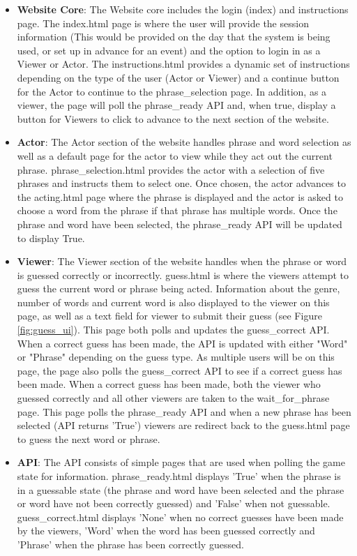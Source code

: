\begin{itemize}

	\item \textbf{Website Core}: The Website core includes the login (index) and instructions page. The index.html page is where the user will provide the session information (This would be provided on the day that the system is being used, or set up in advance for an event) and the option to login in as a Viewer or Actor. The instructions.html provides a dynamic set of instructions depending on the type of the user (Actor or Viewer) and a continue button for the Actor to continue to the phrase\_selection page. In addition, as a viewer, the page will poll the phrase\_ready API and, when true, display a button for Viewers to click to advance to the next section of the website.
	
	\item \textbf{Actor}: The Actor section of the website handles phrase and word selection as well as a default page for the actor to view while they act out the current phrase. phrase\_selection.html provides the actor with a selection of five phrases and instructs them to select one. Once chosen, the actor advances to the acting.html page where the phrase is displayed and the actor is asked to choose a word from the phrase if that phrase has multiple words. Once the phrase and word have been selected, the phrase\_ready API will be updated to display True.
	
	\item \textbf{Viewer}: The Viewer section of the website handles when the phrase or word is guessed correctly or incorrectly. guess.html is where the viewers attempt to guess the current word or phrase being acted. Information about the genre, number of words and current word is also displayed to the viewer on this page, as well as a text field for viewer to submit their guess (see Figure \ref{fig:guess_ui}). This page both polls and updates the guess\_correct API. When a correct guess has been made, the API is updated with either "Word" or "Phrase" depending on the guess type. As multiple users will be on this page, the page also polls the guess\_correct API to see if a correct guess has been made. When a correct guess has been made, both the viewer who guessed correctly and all other viewers are taken to the wait\_for\_phrase page. This page polls the phrase\_ready API and when a new phrase has been selected (API returns 'True') viewers are redirect back to the guess.html page to guess the next word or phrase.
	
	\item \textbf{API}: The API consists of simple pages that are used when polling the game state for information. phrase\_ready.html displays 'True' when the phrase is in a guessable state (the phrase and word have been selected and the phrase or word have not been correctly guessed) and 'False' when not guessable. guess\_correct.html displays 'None' when no correct guesses have been made by the viewers, 'Word' when the word has been guessed correctly and 'Phrase' when the phrase has been correctly guessed.
	
\end{itemize}


